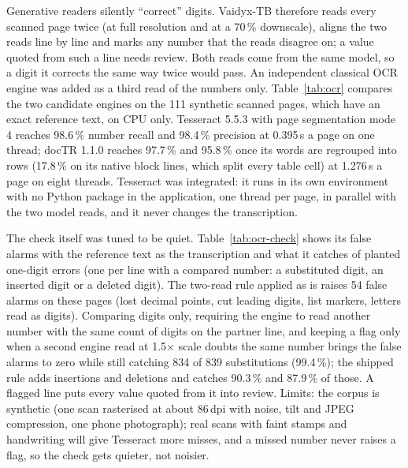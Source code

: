\documentclass{article}
\newcommand{\fit}[1]{\adjustbox{max width=\textwidth}{#1}}
\newcommand{\pct}{\,\%}
\begin{document}
Generative readers silently ``correct'' digits. Vaidyx-TB therefore reads every scanned page twice (at full resolution and at a 70\pct{} downscale), aligns the two reads line by line and marks any number that the reads disagree on; a value quoted from such a line needs review. Both reads come from the same model, so a digit it corrects the same way twice would pass. An independent classical OCR engine was added as a third read of the numbers only. Table~\ref{tab:ocr} compares the two candidate engines on the 111 synthetic scanned pages, which have an exact reference text, on CPU only. Tesseract 5.5.3 \citep{smith2007tesseract} with page segmentation mode 4 reaches 98.6\pct{} number recall and 98.4\pct{} precision at 0.395\,s a page on one thread; docTR 1.1.0 reaches 97.7\pct{} and 95.8\pct{} once its words are regrouped into rows (17.8\pct{} on its native block lines, which split every table cell) at 1.276\,s a page on eight threads. Tesseract was integrated: it runs in its own environment with no Python package in the application, one thread per page, in parallel with the two model reads, and it never changes the transcription.

The check itself was tuned to be quiet. Table~\ref{tab:ocr-check} shows its false alarms with the reference text as the transcription and what it catches of planted one-digit errors (one per line with a compared number: a substituted digit, an inserted digit or a deleted digit). The two-read rule applied as is raises 54 false alarms on these pages (lost decimal points, cut leading digits, list markers, letters read as digits). Comparing digits only, requiring the engine to read another number with the same count of digits on the partner line, and keeping a flag only when a second engine read at 1.5$\times$ scale doubts the same number brings the false alarms to zero while still catching 834 of 839 substitutions (99.4\pct{}); the shipped rule adds insertions and deletions and catches 90.3\pct{} and 87.9\pct{} of those. A flagged line puts every value quoted from it into review. Limits: the corpus is synthetic (one scan rasterised at about 86\,dpi with noise, tilt and JPEG compression, one phone photograph); real scans with faint stamps and handwriting will give Tesseract more misses, and a missed number never raises a flag, so the check gets quieter, not noisier.

\begin{table}[htbp]
\centering\small
\caption{Independent OCR engines on 111 synthetic scanned pages with an exact reference text, CPU only. Recall = reference numbers found on the aligned engine line; precision = engine numbers found on the aligned reference line.}
\label{tab:ocr}
\fit{}
\end{table}
\end{document}
